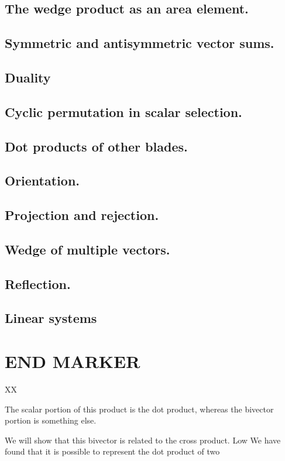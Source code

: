 \subsection{The wedge product as an area element.}
\subsection{Symmetric and antisymmetric vector sums.}
\subsection{Duality}
\subsection{Cyclic permutation in scalar selection.}
\subsection{Dot products of other blades.}
\subsection{Orientation.}
\subsection{Projection and rejection.}
\subsection{Wedge of multiple vectors.}
\subsection{Reflection.}
\subsection{Linear systems}

\section{END MARKER}

XX

The scalar portion of this product is the dot product, whereas the bivector portion is something else.


We will show that this bivector is related to the  cross product.
Low
We have found that it is possible to represent the dot product of two

